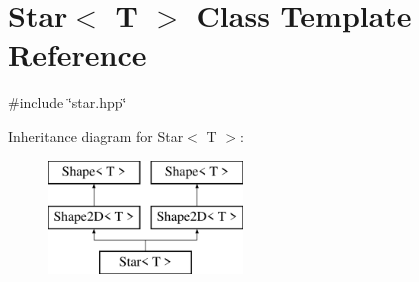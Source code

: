 \hypertarget{classStar}{}\section{Star$<$ T $>$ Class Template Reference}
\label{classStar}


{\ttfamily \#include \char`\"{}star.\+hpp\char`\"{}}

Inheritance diagram for Star$<$ T $>$\+:\begin{figure}[H]
\begin{center}
\leavevmode
\includegraphics[height=3.000000cm]{classStar}
\end{center}
\end{figure}
